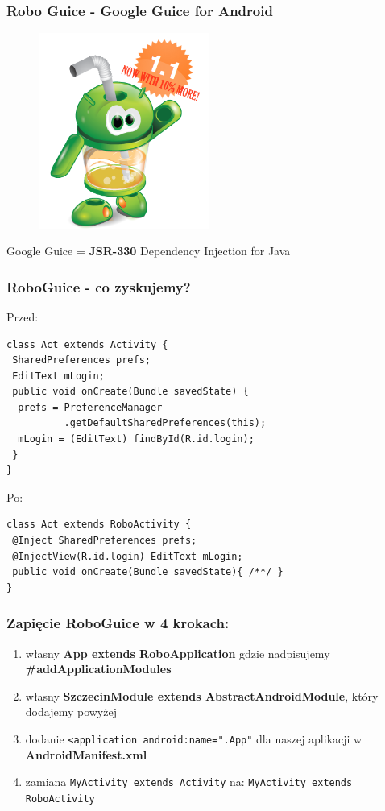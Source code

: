 \documentclass{beamer}
\begin{document}
\begin{frame}\frametitle{Robo Guice - Google Guice for Android}
 \begin{figure}[c]
 \includegraphics[width=0.5\textwidth]{images/roboguice}  
 \end{figure}
 
 \begin{center}
  Google Guice = \textbf{JSR-330} Dependency Injection for Java
 \end{center}
\end{frame}

\begin{frame}[fragile]\frametitle{RoboGuice - co zyskujemy?}
Przed:
\begin{lstlisting}
class Act extends Activity {
 SharedPreferences prefs;
 EditText mLogin;
 public void onCreate(Bundle savedState) {
  prefs = PreferenceManager
          .getDefaultSharedPreferences(this);
  mLogin = (EditText) findById(R.id.login);
 }
}
\end{lstlisting}

\pause

Po:
\begin{lstlisting}
class Act extends RoboActivity {
 @Inject SharedPreferences prefs;
 @InjectView(R.id.login) EditText mLogin;
 public void onCreate(Bundle savedState){ /**/ }
}
\end{lstlisting}

\end{frame}


\begin{frame}[fragile]\frametitle{Zapięcie RoboGuice w 4 krokach:}
\begin{enumerate}
 \item własny \textbf{App extends RoboApplication} gdzie nadpisujemy \textbf{\#addApplicationModules}
 \pause \item własny \textbf{SzczecinModule extends AbstractAndroidModule}, który dodajemy powyżej
 \pause \item dodanie \verb|<application android:name=".App"| dla naszej aplikacji w \textbf{AndroidManifest.xml}
 \pause \item zamiana \verb|MyActivity extends Activity| na: \verb|MyActivity extends RoboActivity|
\end{enumerate}
\end{frame}
\end{document}
